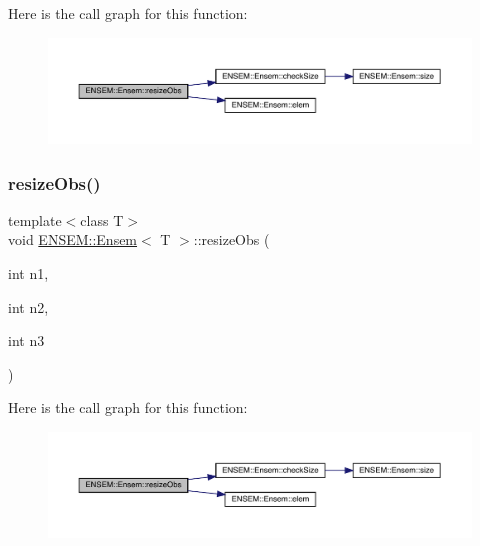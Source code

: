 Here is the call graph for this function\+:
\nopagebreak
\begin{figure}[H]
\begin{center}
\leavevmode
\includegraphics[width=350pt]{d7/d3e/classENSEM_1_1Ensem_af74074307267e421a53a3e9e9e2449fc_cgraph}
\end{center}
\end{figure}
\mbox{\label{classENSEM_1_1Ensem_a8d63351cad23f2af13f26c7326d1abcf}} 
\subsubsection{\texorpdfstring{resizeObs()}{resizeObs()}\hspace{0.1cm}{\footnotesize\ttfamily [5/8]}}
{\footnotesize\ttfamily template$<$class T$>$ \\
void \mbox{\hyperlink{classENSEM_1_1Ensem}{E\+N\+S\+E\+M\+::\+Ensem}}$<$ T $>$\+::resize\+Obs (\begin{DoxyParamCaption}\item[{int}]{n1,  }\item[{int}]{n2,  }\item[{int}]{n3 }\end{DoxyParamCaption})\hspace{0.3cm}{\ttfamily [inline]}}

Here is the call graph for this function\+:
\nopagebreak
\begin{figure}[H]
\begin{center}
\leavevmode
\includegraphics[width=350pt]{d7/d3e/classENSEM_1_1Ensem_a8d63351cad23f2af13f26c7326d1abcf_cgraph}
\end{center}
\end{figure}
\mbox{\label{classENSEM_1_1Ensem_a8d63351cad23f2af13f26c7326d1abcf}} 
